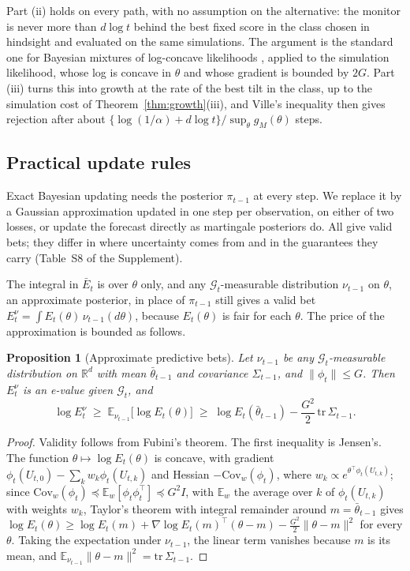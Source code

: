 \documentclass[12pt]{article}
\newcommand{\E}{\mathbb{E}}
\newcommand{\G}{\mathcal{G}}
\newtheorem{proposition}{Proposition}
\theoremstyle{remark}
\begin{document}
Part (ii) holds on every path, with no assumption on the alternative: the
monitor is never more than $d\log t$ behind the best fixed score in the class
chosen in hindsight and evaluated on the same simulations. The argument is the
standard one for Bayesian mixtures of log-concave likelihoods
\citep{kakade2005online}, applied to the simulation
likelihood, whose log is concave in $\theta$ and whose gradient is bounded by
$2G$. Part (iii) turns this into growth at the rate of the best tilt in the
class, up to the simulation cost of Theorem~\ref{thm:growth}(iii), and
Ville's inequality then gives rejection after about
$\{\log(1/\alpha) + d\log t\}/\sup_\theta g_M(\theta)$ steps.

\subsection{Practical update rules}\label{sec:blr}\label{sec:algorithm}

Exact Bayesian updating needs the posterior $\pi_{t-1}$ at every step. We
replace it by a Gaussian approximation updated in one step per observation,
on either of two losses, or update the forecast directly as martingale
posteriors do. All give valid bets; they differ in where uncertainty comes from
and in the guarantees they carry (Table~S8 of the Supplement).

The integral in $\bar E_t$ is over $\theta$ only, and any $\G_t$-measurable
distribution $\nu_{t-1}$ on $\theta$, an approximate posterior, in place of
$\pi_{t-1}$ still gives a valid bet
$E^{\nu}_t = \int E_t(\theta)\,\nu_{t-1}(d\theta)$, because $E_t(\theta)$ is
fair for each $\theta$. The price of the approximation is bounded as follows.

\begin{proposition}[Approximate predictive bets]\label{prop:approx}
Let $\nu_{t-1}$ be any $\G_t$-measurable distribution on $\mathbb{R}^d$ with mean
$\bar\theta_{t-1}$ and covariance $\Sigma_{t-1}$, and $\|\phi_t\| \le G$. Then
$E^{\nu}_t$ is an e-value given $\G_t$, and
\[
\log E^{\nu}_t \;\ge\; \E_{\nu_{t-1}}\big[\log E_t(\theta)\big]
\;\ge\; \log E_t(\bar\theta_{t-1}) - \frac{G^2}{2}\,\mathrm{tr}\,\Sigma_{t-1}.
\]
\end{proposition}

\begin{proof}
Validity follows from Fubini's theorem. The first inequality is Jensen's.
The function $\theta \mapsto \log E_t(\theta)$ is concave, with gradient
$\phi_t(U_{t,0}) - \sum_k w_k \phi_t(U_{t,k})$ and Hessian
$-\mathrm{Cov}_w(\phi_t)$, where $w_k \propto e^{\theta^\top\phi_t(U_{t,k})}$;
since $\mathrm{Cov}_w(\phi_t) \preceq \E_w[\phi_t\phi_t^\top] \preceq G^2 I$, with $\E_w$
the average over $k$ of $\phi_t(U_{t,k})$ with weights $w_k$,
Taylor's theorem with integral remainder around $m = \bar\theta_{t-1}$ gives
$\log E_t(\theta) \ge \log E_t(m) + \nabla\log E_t(m)^\top(\theta - m)
- \frac{G^2}{2}\|\theta - m\|^2$ for every $\theta$. Taking the expectation
under $\nu_{t-1}$, the linear term vanishes because $m$ is its mean, and
$\E_{\nu_{t-1}}\|\theta - m\|^2 = \mathrm{tr}\,\Sigma_{t-1}$.
\end{proof}
\end{document}
